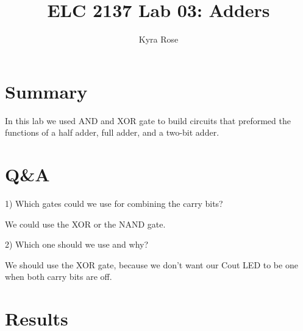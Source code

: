 \documentclass[11pt]{article}
\begin{document}
\title{ELC 2137 Lab 03: Adders}
\author{Kyra Rose}

\maketitle


\section*{Summary}

In this lab we used AND and XOR gate to build circuits that preformed the functions of a half adder, full adder, and a two-bit adder. 


\section*{Q\&A}

1) Which gates could we use for combining the carry bits?

We could use the XOR or the NAND gate. 

2) Which one should we use and why? 

We should use the XOR gate, because we don't want our Cout LED to be one when both carry bits are off. 


\section*{Results}
\end{document}
